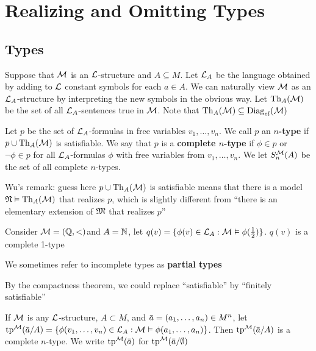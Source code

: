 \documentclass[11pt]{article}
\begin{document}
\section{Realizing and Omitting Types}
\label{sec:org3026b1d}

\subsection{Types}
\label{sec:orgb08965e}
Suppose that \(\mathcal{M}\) is an \(\mathcal{L}\)-structure and \(A\subseteq M\). Let \(\mathcal{L}_A\) be the language obtained by
adding to \(\mathcal{L}\) constant symbols for each \(a\in A\). We can naturally view \(\mathcal{M}\) as
an \(\mathcal{L}_A\)-structure by interpreting the new symbols in the obvious way. Let \(\operatorname{Th}_A(\mathcal{M})\) be the
set of all \(\mathcal{L}_A\)-sentences true in \(\mathcal{M}\). Note that \(\operatorname{Th}_A(\mathcal{M})\subseteq\operatorname{Diag}_{el}(\mathcal{M})\)

\begin{definition}[]
Let \(p\) be the set of \(\mathcal{L}_A\)-formulas in free variables \(v_1,\dots,v_n\). We call \(p\) an
\textbf{\(n\)-type} if \(p\cup\operatorname{Th}_A(\mathcal{M})\) is satisfiable. We say that \(p\) is a \textbf{complete \(n\)-type}
if \(\phi\in p\) or \(\neg\phi\in p\) for all \(\mathcal{L}_A\)-formulas \(\phi\) with free variables from \(v_1,\dots,v_n\). We
let \(S_n^{\mathcal{M}}(A)\) be the set of all complete \(n\)-types.
\end{definition}

\begin{remark}
Wu's remark: guess here \(p\cup\operatorname{Th}_A(\mathcal{M})\) is satisfiable means that there is a model \(\mathfrak{N}\vDash\operatorname{Th}_A(\mathcal{M})\)
that realizes \(p\), which is slightly different from ``there is an elementary extension
of \(\mathfrak{M}\) that realizes \(p\)''
\end{remark}

Consider \(\mathcal{M}=(\mathbb{Q},<)\)and \(A=\mathbb{N}\), let \(q(v)=\{\phi(v)\in\mathcal{L}_A:\mathcal{M}\vDash\phi(\frac{1}{2})\}\). \(q(v)\) is a complete 1-type

We sometimes refer to incomplete types as \textbf{partial types}

By the compactness theorem, we could replace ``satisfiable'' by ``finitely satisfiable''

If \(\mathcal{M}\) is any \(\mathcal{L}\)-structure, \(A\subset M\), and \(\bara=(a_1,\dots,a_n)\in M^n\), let
\(\tp^{\calm}(\bara/A)=\{\phi(v_1,\dots,v_n)\in\call_A:\calm\vDash\phi(a_1,\dots,a_n)\}\). Then \(\tp^{\calm}(\bara/A)\) is a
complete \(n\)-type. We write \(\tp^{\calm}(\bara)\) for \(\tp^{\calm}(\bara/\emptyset)\)
\end{document}
